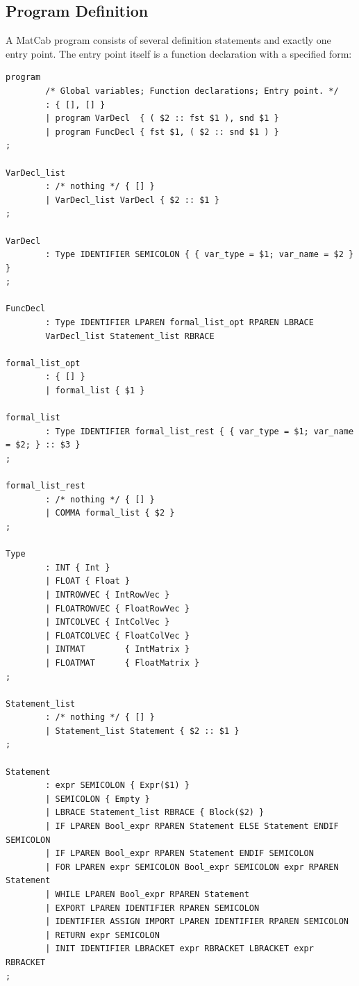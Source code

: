 \documentclass[12pt]{article} %
\begin{document}
\subsection{Program Definition}
A MatCab program consists of several definition statements and exactly one entry point. The entry point itself is a function declaration with a specified form:
\begin{verbatim}
program
        /* Global variables; Function declarations; Entry point. */
        : { [], [] }
        | program VarDecl  { ( $2 :: fst $1 ), snd $1 }
        | program FuncDecl { fst $1, ( $2 :: snd $1 ) }
;

VarDecl_list
        : /* nothing */ { [] }
        | VarDecl_list VarDecl { $2 :: $1 }
;

VarDecl
        : Type IDENTIFIER SEMICOLON { { var_type = $1; var_name = $2 } }
;

FuncDecl
        : Type IDENTIFIER LPAREN formal_list_opt RPAREN LBRACE 
        VarDecl_list Statement_list RBRACE 

formal_list_opt
        : { [] }
        | formal_list { $1 }

formal_list
        : Type IDENTIFIER formal_list_rest { { var_type = $1; var_name = $2; } :: $3 }
;

formal_list_rest
        : /* nothing */ { [] }
        | COMMA formal_list { $2 }
;

Type
        : INT { Int }
        | FLOAT { Float }
        | INTROWVEC { IntRowVec }
        | FLOATROWVEC { FloatRowVec }
        | INTCOLVEC { IntColVec }
        | FLOATCOLVEC { FloatColVec }
        | INTMAT        { IntMatrix }
        | FLOATMAT      { FloatMatrix }
;

Statement_list
        : /* nothing */ { [] }
        | Statement_list Statement { $2 :: $1 }
;

Statement
        : expr SEMICOLON { Expr($1) }
        | SEMICOLON { Empty }
        | LBRACE Statement_list RBRACE { Block($2) }
        | IF LPAREN Bool_expr RPAREN Statement ELSE Statement ENDIF SEMICOLON
        | IF LPAREN Bool_expr RPAREN Statement ENDIF SEMICOLON 
        | FOR LPAREN expr SEMICOLON Bool_expr SEMICOLON expr RPAREN Statement
        | WHILE LPAREN Bool_expr RPAREN Statement 
        | EXPORT LPAREN IDENTIFIER RPAREN SEMICOLON
        | IDENTIFIER ASSIGN IMPORT LPAREN IDENTIFIER RPAREN SEMICOLON
        | RETURN expr SEMICOLON 
        | INIT IDENTIFIER LBRACKET expr RBRACKET LBRACKET expr RBRACKET
;


\end{verbatim}
\end{document}
